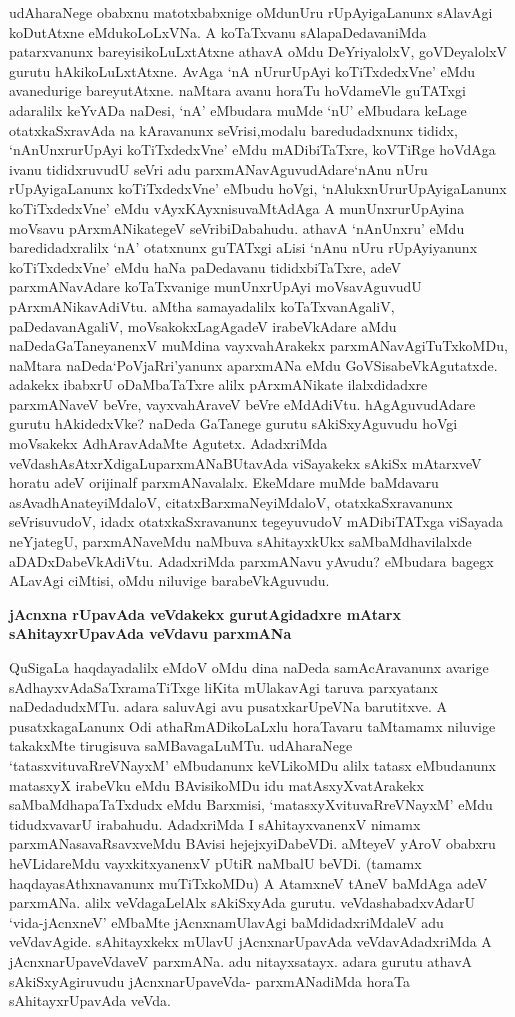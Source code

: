 udAharaNege obabxnu matotxbabxnige oMdunUru rUpAyigaLanunx sAlavAgi koDutAtxne eMdu\-koLoLxVNa. A koTaTxvanu sAlapaDedavaniMda patarxvanunx bareyisi\-koLuLxtAtxne athavA oMdu DeYri\-yalolxV, goVDeyalolxV gurutu hAkikoLuLxtAtxne. AvAga `nA nUrurUpAyi koTiTxdedxVne' eMdu avanedu\-rige bareyutAtxne. naMtara avanu horaTu hoVdameVle guTATxgi adaralilx keYvADa naDesi, `nA' eMbu\-dara muMde `nU' eMbudara keLage otatxkaSxravAda na kAravanunx seVrisi,\break modalu baredudadxnunx tididx, `nAnUnxru\-rUpAyi koTiTxdedxVne' eMdu mADi\-biTaTxre, koVTiRge hoVdAga ivanu tididxruvudU seVri adu parxmANa\-vAguvudAdare\break `nAnu nUru rUpAyigaLanunx koTiTxdedxVne' eMbudu hoVgi, `nAlukx\-nUru\break rUpAyigaLanunx koTiTxdedxVne' eMdu vAyxKAyxnisuvaMtAdAga A munUnxru\break rUpAyina moVsavu pArxmA\-NikategeV seVribiDabahudu. athavA `nAnUnxru' eMdu baredidadxralilx `nA' otatxnunx guTATxgi aLisi `nAnu nUru rUpAyiyanunx koTiTxdedxVne' eMdu haNa paDedavanu tididxbiTaTxre, adeV parxmANavAdare koTaTxvanige munUnxrUpAyi moVsavAguvudU pArxmANikavAdiVtu. aMtha samayadalilx koTaTxva\-nAgaliV, paDedavanAgaliV, moVsakokxLagAgadeV irabeVkAdare aMdu naDeda\break GaTaneyanenxV muMdina vayxvahArakekx parxmANavAgiTuTxkoMDu, naMtara naDeda\break `PoVjaRri'yanunx aparxmANa eMdu GoVSisa\-beVkAgutatxde. adakekx ibabxrU oDaM\-baTaTxre alilx pArxmANikate ilalxdidadxre parxmANaveV beVre, vayxvahAraveV beVre eMdA\-diVtu. hAgAguvudAdare gurutu hAkidedxVke? naDeda GaTanege gurutu sAkiSx\-yAgu\-vudu hoVgi moVsakekx AdhAravAdaMte Agutetx. AdadxriMda veVdashAsAtxrXdigaLu\break parxmANa\-BUtavAda viSayakekx sAkiSx mAtarxveV horatu adeV orijinalf parxmANa\-valalx. EkeMdare muMde baMdavaru asAvadhAnate\-yiMdaloV, citatxBarxmaNe\break\-yiMdaloV, otatxkaSxravanunx seVrisuvudoV, idadx otatxkaSxravanunx tegeyuvudoV mADi\-biTATxga viSayada neYjategU, parxmANaveMdu naMbuva sAhitayxkUkx saMbaMdhavilalxde aDADxDabeVkA\-diVtu. AdadxriMda parxmANavu yAvudu? eMbudara bagegx ALavAgi ciMtisi, oMdu niluvige barabeVkA\-guvudu.

{\bigskip
\noindent
{\large\bf jAcnxna rUpavAda veVdakekx gurutAgidadxre mAtarx sAhitayxrUpavAda veVdavu parxmANa}}\label{page137}
\medskip

\noindent
QuSigaLa haqdayadalilx eMdoV oMdu dina naDeda samAcAravanunx avarige sAdhayxvAdaSaTxra\-maTiTxge liKita mUlakavAgi taruva parxyatanx naDedadudxMTu. adara saluvAgi avu pusatxkarUpeVNa baru\-titxve. A pusatxkagaLanunx Odi athaRmADikoLaLxlu horaTavaru taMtamamx niluvige takakxMte tirugisuva saMBava\-gaLuMTu. udAharaNege `tatasxvituvaRreVNayxM' eMbudanunx keVLikoMDu alilx tatasx eMbudanunx matasxyX irabeVku eMdu BAvisikoMDu idu matAsxyXvatArakekx saMbaMdhapaTaTxdudx eMdu Barxmisi, `matasxyXvitu\-vaRreVNayxM' eMdu tidudxvavarU irabahudu. AdadxriMda I sAhitayxvanenxV nimamx parxmANasavaRsavxveMdu BAvisi hejejxyiDabeVDi. aMteyeV yAroV obabxru heVLidareMdu vayxkitxyanenxV pUtiR naMbalU beVDi. (tamamx haqdayasAthxnavanunx muTiTxkoMDu) A AtamxneV tAneV baMdAga adeV parxmANa. alilx veVda\-gaLelAlx sAkiSxyAda gurutu. veVdashabadxvAdarU `vida-jAcnxneV' eMbaMte jAcnxnamUlavAgi baMdidadx\-riMdaleV adu veVdavAgide. sAhitayxkekx mUlavU jAcnxnarUpavAda veVdavAdadxriMda A jAcnxnarUpaveVdaveV parx\-mANa. adu nitayxsatayx. adara gurutu athavA sAkiSxyAgiruvudu jAcnxnarUpaveVda- parxmANa\-diMda horaTa sAhitayxrUpavAda veVda.

